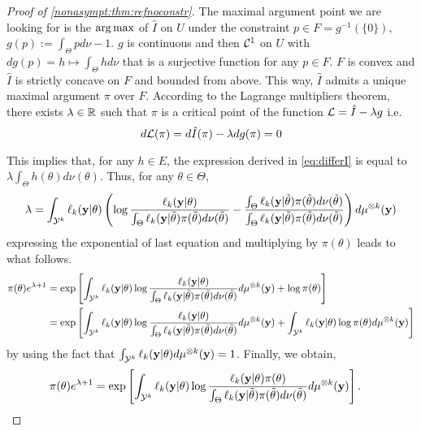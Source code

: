 \begin{proof}[Proof of \cref{nonasympt:thm:refnoconstr}]
    The maximal argument point we are looking for is the $\operatorname*{arg\,max}$ of $\hat I$ on $U$ under the constraint $p\in F =g^{-1}(\{0\})$, $g(p):=\int_\Theta pd\nu-1$. $g$ is continuous and then $\mathcal{C}^1$ on $U$ with $dg(p)=h\mapsto\int_\Theta hd\nu$ that is a surjective function for any $p\in F$. $F$ is convex and $\hat I$ is strictly concave on $F$ and bounded from above. This way, $\hat I$ admits a unique maximal argument $\pi$ over $F$. According to the Lagrange multipliers theorem, there exists $\lambda\in\mathbb{R}$ such that $\pi$ is a critical point of the function $\mathcal{L} = \hat I - \lambda g$ i.e.        
        \begin{equation}\label{eq:lagran}
            d\mathcal{L}(\pi) = d\hat I(\pi) - \lambda dg(\pi) =  0  
        \end{equation}
    
    This implies that, for any $h\in E$, the expression derived in \cref{eq:differI} is equal to $\lambda\int_\Theta h(\theta)d\nu(\theta) $. Thus,  for any $\theta\in\Theta$,
        \begin{align}
            \lambda = \int_{\mathcal{Y}^k} \ell_k(\mathbf{y}|\theta)\left(\log\frac{\ell_k(\mathbf{y}|\theta)}{\int_\Theta \ell_k(\mathbf{y}|\tilde\theta)\pi(\tilde\theta)d\nu(\tilde\theta)} - \frac{\int_\Theta \ell_k(\mathbf{y}|\tilde\theta)\pi(\tilde\theta)d\nu(\tilde\theta)}{\int_\Theta \ell_k(\mathbf{y}|\tilde\theta)\pi(\tilde\theta)d\nu(\tilde\theta)}\right)d\mu^{\otimes k}(\mathbf{y})
        \end{align}
    expressing the exponential of last equation and multiplying by $\pi(\theta)$ leads to what follows.
        \begin{align}\label{eq:passedtoexp}
            \pi(\theta) e^{\lambda+1} &= \exp\left[\int_{\mathcal{Y}^k} \ell_k(\mathbf{y}|\theta)\log\frac{\ell_k(\mathbf{y}|\theta)}{\int_\Theta \ell_k(\mathbf{y}|\tilde\theta)\pi(\tilde\theta)d\nu(\tilde\theta)}d\mu^{\otimes k}(\mathbf{y}) + \log \pi(\theta)\right] \\
               &= \exp\left[\int_{\mathcal{Y}^k} \ell_k(\mathbf{y}|\theta)\log\frac{\ell_k(\mathbf{y}|\theta)}{\int_\Theta \ell_k(\mathbf{y}|\tilde\theta)\pi(\tilde\theta)d\nu(\tilde\theta)}d\mu^{\otimes k}(\mathbf{y}) + \int_{\mathcal{Y}^k} \ell_k(\mathbf{y}|\theta)\log \pi(\theta)d\mu^{\otimes k}(\mathbf{y})\right] \nonumber
        \end{align}
    by using the fact that $\int_{\mathcal{Y}^k} \ell_k(\mathbf{y}|\theta)d\mu^{\otimes k}(\mathbf{y})=1$. Finally, we obtain,
        \begin{align}\label{eq:finalpprop}
            \pi(\theta)e^{\lambda+1} &= \exp\left[ \int_{\mathcal{Y}^k} \ell_k(\mathbf{y}|\theta)\log\frac{ \ell_k(\mathbf{y}|\theta)\pi(\theta)}{\int_\Theta \ell_k(\mathbf{y}|\tilde\theta)\pi(\tilde\theta)d\nu(\tilde\theta)}d\mu^{\otimes k}(\mathbf{y})\right].
        \end{align}



\end{proof}





